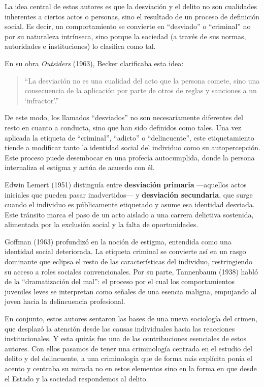 \documentclass[
  spanish,
  letterpaper,
  DIV=11,
  numbers=noendperiod]{scrreprt}
\begin{document}
La idea central de estos autores es que la desviación y el delito no son
cualidades inherentes a ciertos actos o personas, sino el resultado de
un proceso de definición social. Es decir, un comportamiento se
convierte en ``desviado'' o ``criminal'' no por su naturaleza
intrínseca, sino porque la sociedad (a través de sus normas, autoridades
e instituciones) lo clasifica como tal.

En su obra \emph{Outsiders} (1963), Becker clarificaba esta idea:

\begin{quote}
``La desviación no es una cualidad del acto que la persona comete, sino
una consecuencia de la aplicación por parte de otros de reglas y
sanciones a un `infractor'.''
\end{quote}

De este modo, los llamados ``desviados'' no son necesariamente
diferentes del resto en cuanto a conducta, sino que han sido definidos
como tales. Una vez aplicada la etiqueta de ``criminal'', ``adicto'' o
``delincuente'', este etiquetamiento tiende a modificar tanto la
identidad social del individuo como su autopercepción. Este proceso
puede desembocar en una profecía autocumplida, donde la persona
internaliza el estigma y actúa de acuerdo con él.

Edwin Lemert (1951) distinguía entre \textbf{desviación primaria}
---aquellos actos iniciales que pueden pasar inadvertidos--- y
\textbf{desviación secundaria}, que surge cuando el individuo es
públicamente etiquetado y asume esa identidad desviada. Este tránsito
marca el paso de un acto aislado a una carrera delictiva sostenida,
alimentada por la exclusión social y la falta de oportunidades.

Goffman (1963) profundizó en la noción de estigma, entendida como una
identidad social deteriorada. La etiqueta criminal se convierte así en
un rasgo dominante que eclipsa el resto de las características del
individuo, restringiendo su acceso a roles sociales convencionales. Por
su parte, Tannenbaum (1938) habló de la ``dramatización del mal'': el
proceso por el cual los comportamientos juveniles leves se interpretan
como señales de una esencia maligna, empujando al joven hacia la
delincuencia profesional.

En conjunto, estos autores sentaron las bases de una nueva sociología
del crimen, que desplazó la atención desde las causas individuales hacia
las reacciones institucionales. Y esta quizás fue una de las
contribuciones esenciales de estos autores. Con ellos pasamos de tener
una criminología centrada en el estudio del delito y del delincuente, a
una criminología que de forma más explícita ponía el acento y centraba
su mirada no en estos elementos sino en la forma en que desde el Estado
y la sociedad respondemos al delito.
\end{document}
